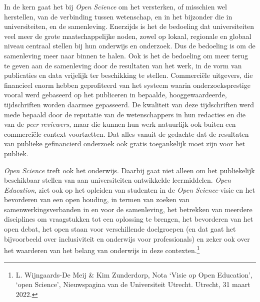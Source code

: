 \documentclass[smallauthor, chapterhaspagenum, nochapterinheader, pagenuminheader,  bigchapnum,medium2, tocpages,  garamond, titleinheader]{jote-book}
\begin{document}
	In de kern gaat het bij \emph{Open }\emph{Science} om het versterken, of misschien wel herstellen, van de verbinding tussen wetenschap, en in het bijzonder die in universiteiten, en de samenleving. Enerzijds is het de bedoeling dat universiteiten veel meer de grote maatschappelijke noden, zowel op lokaal, regionale en globaal niveau centraal stellen bij hun onderwijs en onderzoek. Dus de bedoeling is om de samenleving meer naar binnen te halen. Ook is het de bedoeling om meer terug te geven aan de samenleving door de resultaten van het werk, in de vorm van publicaties en data vrijelijk ter beschikking te stellen. Commerciële uitgevers, die financieel enorm hebben geprofiteerd van het systeem waarin onderzoeksprestige vooral werd gebaseerd op het publiceren in bepaalde, hooggewaardeerde, tijdschriften worden daarmee gepasseerd. De kwaliteit van deze tijdschriften werd mede bepaald door de reputatie van de wetenschappers in hun redacties en die van de \emph{peer}\emph{ }\emph{reviewers}\emph{, }maar die\emph{ }kunnen hun werk natuurlijk ook buiten een commerciële context voortzetten. Dat alles vanuit de gedachte dat de resultaten van publieke gefinancierd onderzoek ook gratis toegankelijk moet zijn voor het publiek.



	\emph{Open }\emph{Science} treft ook het onderwijs. Daarbij gaat niet alleen om het publiekelijk beschikbaar stellen van aan universiteiten ontwikkelde leermiddelen. \emph{Open }\emph{Education}, ziet ook op het opleiden van studenten in de \emph{Open }\emph{Science}-visie en het bevorderen van een open houding, in termen van zoeken van samenwerkingsverbanden in en voor de samenleving, het betrekken van meerdere disciplines om vraagstukken tot een oplossing te brengen, het bevorderen van het open debat, het open staan voor verschillende doelgroepen (en dat gaat het bijvoorbeeld over inclusiviteit en onderwijs voor professionals) en zeker ook over het waarderen van het belang van onderwijs in deze contexten.\footnote{L. Wijngaards-De Meij \& Kim Zunderdorp, Nota ‘Visie op Open Education', ‘open Science', Nieuwspagina van de Universiteit Utrecht. Utrecht, 31 maart 2022.}
\end{document}
